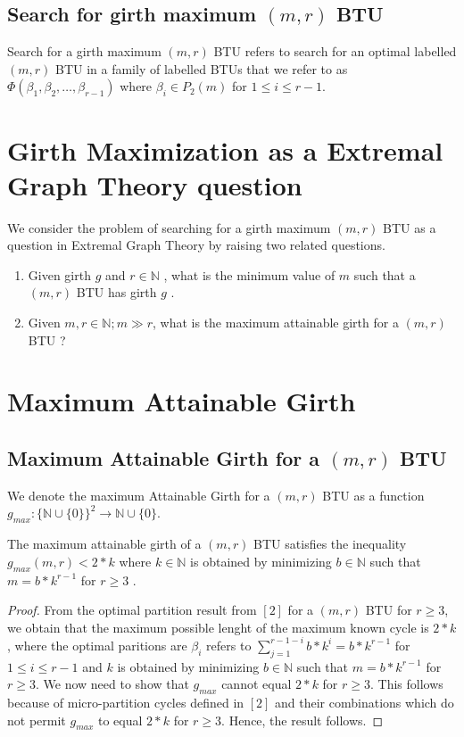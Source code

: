 \documentclass{llncs}
\begin{document}
\subsection{Search for girth maximum $(m, r)$ BTU }
Search for a girth maximum $(m, r)$ BTU refers to search for an optimal labelled  $(m,r)$ BTU in a family of labelled BTUs that we refer to as  
$\Phi (\beta _{1},\beta _{2},\ldots ,\beta _{r - 1})$ where $\beta _{i}\in P_{2}(m)$ for  $1\le i\le r-1$. 

\section {Girth Maximization as a Extremal Graph Theory question}

We consider the problem of searching for a girth maximum $(m,r)$ BTU as a question in Extremal Graph Theory by raising two related questions.
\begin{enumerate}
\item Given girth $g$ and  $r\in \mathbb{N}$ , what is the minimum value of  $m$ such that a $(m,r)$ BTU has girth $g$  .
\item Given  $m,r\in \mathbb{N};m\gg r$, what is the maximum attainable girth for a $(m,r)$ BTU ?
\end{enumerate}

\section{Maximum Attainable Girth}
\subsection {Maximum Attainable Girth for a $(m,r)$ BTU}
We denote the maximum Attainable Girth for a $(m,r)$ BTU as a function  $g_{\mathit{max}}:\{\mathbb{N}\cup \{0\}\}^{2}\to \mathbb{N}\cup \{0\}$.

\begin{theorem}
The maximum attainable girth of a  $(m,r)$  BTU satisfies the inequality  $g_{\mathit{max}}(m,r)<2\ast k$  where  $k\in \mathbb{N}$  is obtained by minimizing  $b\in \mathbb{N}$  such that  $m=b\ast k^{r-1}$ for $r\ge 3$ .
\end{theorem}
\begin{proof}
From the optimal partition result from $[2]$ for a $(m, r)$ BTU for $r\ge 3$, we obtain that the maximum possible lenght of the maximum known cycle is $2 *k$, where the optimal paritions are $\beta _{i}${ refers to } $\sum _{j=1}^{r-1-i}b\ast k^{i}=b\ast k^{r-1}$ {for } $1\le i\le r-1$ and $k$ is obtained by minimizing $b\in \mathbb{N}$  such that  $m=b\ast k^{r-1}$ for $r\ge 3$. We now need to show that $g_{\mathit{max}}$ cannot equal $2*k$ for $r\ge 3$. This follows because of micro-partition cycles defined in $[2]$ and their combinations which do not permit $g_{\mathit{max}}$ to equal $2*k$ for $r\ge 3$. Hence, the result follows.
\end{proof} 
\end{document}
